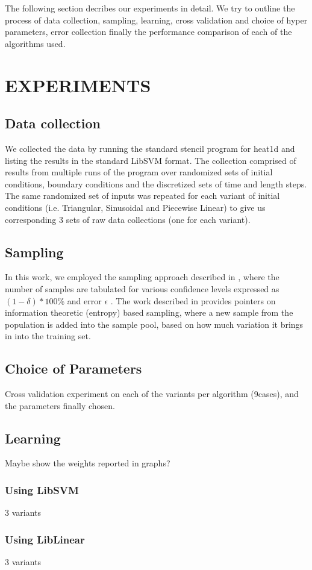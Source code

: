 \documentclass[letterpaper, 11 pt, conference]{ieeeconf}
\begin{document}
The following section decribes our experiments in detail. We try to outline the process of data collection, sampling, learning, cross validation and choice of hyper parameters, error collection finally the performance comparison of each of the algorithms used.  


\section{EXPERIMENTS}
\subsection{Data collection}
We collected the data by running the standard stencil program for heat1d \cite{c7} and listing the results in the standard LibSVM format. The collection comprised of results from multiple runs of the program over randomized sets of initial conditions, boundary conditions and the discretized sets of time and length steps. The same randomized set of inputs was repeated for each variant of initial conditions (i.e. Triangular, Sinusoidal and Piecewise Linear) to give us corresponding 3 sets of raw data collections (one for each variant).
\subsection{Sampling}
In this work, we employed the sampling approach described in \cite{c5}, where the  number of samples are tabulated for various confidence levels expressed as $(1-\delta)*100$\% and error $\epsilon$ . The work described in \cite{c2} provides pointers on information theoretic (entropy) based sampling, where a new sample from the population is added into the sample pool, based on how much variation it brings in into the training set.
\subsection{Choice of Parameters}
Cross validation experiment on each of the variants per algorithm (9cases), and the parameters finally chosen. 
\subsection{Learning}
Maybe show the weights reported in graphs?
\subsubsection{Using LibSVM}
3 variants
\subsubsection{Using LibLinear}
3 variants
\end{document}
